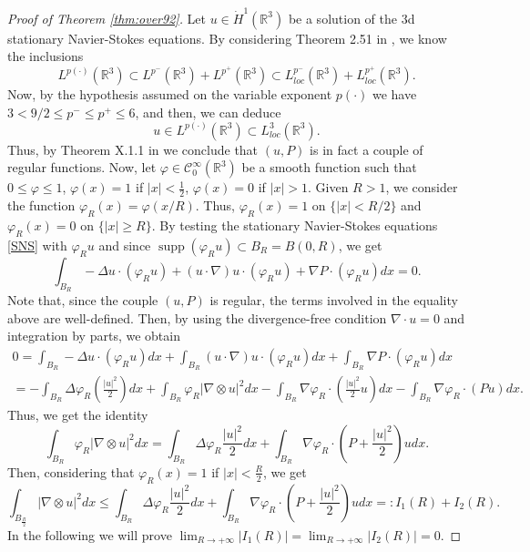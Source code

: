 \documentclass[a4paper,12pt]{amsart}
\theoremstyle{definition}
\theoremstyle{plain}
\def\R{\mathbb{R}}
\renewcommand{\phi}{\varphi}
\let\phi\varphi
\def\R{\mathbb R}
\def\vu{ u }
\def\vn{ \nabla }
\def\supp{\operatorname{supp}}
\begin{document}
\begin{proof}[Proof of Theorem \ref{thm:over92}]
 
   Let  $\vu\in \dot H^1(\R^3) %
   $ be a solution of the 3d stationary Navier-Stokes equations. By considering  Theorem 2.51 in \cite{CRUZ}, we know the inclusions
$$L^{p(\cdot)}(\R^3 )\subset L^{p^-}(\R^3 )+L^{p^+}(\R^3 )
\subset L^{p^-}_{loc}(\R^3 )+L^{p^+}_{loc}(\R^3 )
.$$
Now, by the hypothesis assumed on the variable exponent $p(\cdot)$ we  have $3<9/2\leq p^-\leq p^+\leq 6 $, and  then,  we can deduce  
$$u\in L^{p(\cdot)}(\R^3 ) \subset L^3_{loc}(\R^3 ).$$
Thus, by Theorem X.1.1 in \cite{galdi2011introduction} we conclude that $(\vu,P)$ is in fact a couple of regular functions. 
Now, let $\phi\in {\mathcal{C}}^\infty_0 (\mathbb{R}^3) $ be a smooth function such that $0\leq \phi \leq 1$, $\phi(x)=1$ if $|x|<\frac{1}{2}$, $\phi(x)=0$ if $|x|>1$. Given $R>1$, we consider the function $\phi_R(x)=\phi( {x}/ {R})$. Thus, $\phi_R(x)=1$ on $\{|x|<   R / 2 \}$ and $\phi_R(x)=0$ on $\{|x|\geq R \}$.
By testing the stationary Navier-Stokes equations \eqref{SNS} with $\phi_R \vu$ and since  $\supp (\phi_R \vu)\subset B_R=B(0,R)$,  we get 
\begin{equation}\label{eq. 3_92_exterior_bola}
\int_{B_R}-\Delta \vu \cdot\left(\phi_R \vu\right)+(\vu \cdot \vn) \vu \cdot\left(\phi_R \vu\right)+\vn P \cdot\left(\phi_R \vu\right) d x=0.
\end{equation}
Note that, since the couple $(\vu,P)$ is regular, the terms involved in the equality above are well-defined. Then, by using the divergence-free condition $\nabla \cdot \vu=0$ and integration by parts, we obtain 
\begin{multline}
0=
\int_{B_R}-\Delta \vu \cdot\left(\phi_R \vu\right) dx
+
\int_{B_R}(\vu \cdot \vn) \vu \cdot\left(\phi_R \vu\right) dx
+
\int_{B_R} \vn P \cdot\left(\phi_R \vu\right) d x 
\\
= 
-\int_{B_R} \Delta \phi_R\left(\frac{|\vu|^2}{2}\right) d x+\int_{B_R} \phi_R|\vn \otimes \vu|^2 dx
-\int_{B_R}\vn\phi_R \cdot\left(\frac{|\vu|^2}{2} \vu\right) d x
-\int_{B_R} \vn \phi_R \cdot(P \vu)dx
.
\end{multline}
Thus, we get the identity 
\begin{equation*}
\int_{B_R} \phi_R|\vn \otimes \vu|^2 dx=\int_{B_R} \Delta \phi_R \frac{|\vu|^2}{2} dx+
\int_{B_R} \vn \phi_R \cdot \left(P+\frac{|\vu|^2}{2}\right) \vu dx.
\end{equation*}
Then, 
considering that $\phi_R(x)= 1$ if $|x|< \frac R 2$, we get 
\begin{equation}\label{ineqBase92exteriorbola}
\int_{B_{\frac{R}{2}}}|\vn \otimes \vu|^2 dx \leq \int_{B_R} \Delta \phi_R \frac{|\vu|^2}{2} dx+ \int_{B_R} \vn \phi_R \cdot \left(P+\frac{|\vu|^2}{2}\right) \vu dx 
=: 
I_1(R)+I_2(R)
. 
\end{equation}
In  the following we will prove 
$\lim_{R\to +\infty}  |I_1(R)|=\lim_{R\to +\infty}  |I_2(R)|=0.$


\end{proof}
\end{document}
